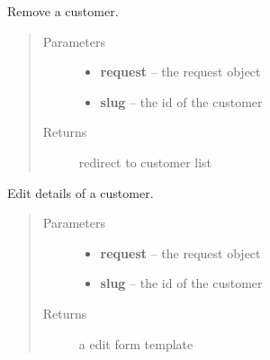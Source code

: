 \documentclass[letterpaper,10pt,english]{sphinxmanual}
\begin{document}
\begin{fulllineitems}
\label{api/system:limeade.system.views.customer_delete}
Remove a customer.
\begin{quote}\begin{description}
\item[{Parameters}] \leavevmode\begin{itemize}
\item {} 
\textbf{request} -- the request object

\item {} 
\textbf{slug} -- the id of the customer

\end{itemize}

\item[{Returns}] \leavevmode
redirect to customer list

\end{description}\end{quote}

\end{fulllineitems}


\begin{fulllineitems}
\label{api/system:limeade.system.views.customer_edit}
Edit details of a customer.
\begin{quote}\begin{description}
\item[{Parameters}] \leavevmode\begin{itemize}
\item {} 
\textbf{request} -- the request object

\item {} 
\textbf{slug} -- the id of the customer

\end{itemize}

\item[{Returns}] \leavevmode
a edit form template

\end{description}\end{quote}

\end{fulllineitems}
\end{document}
